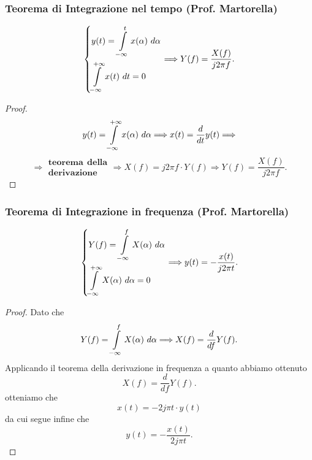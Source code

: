 \documentclass[12pt,oneside,openany]{memoir}
\numberwithin{equation}{subsection}
\newcommand{\dt}{\ dt}
\begin{document}
\subsubsection{Teorema di Integrazione nel tempo (Prof. Martorella)}
\[
    \begin{dcases}
        y(t) = \int\displaylimits_{-\infty}^{t} x(\alpha) \ d \alpha\\
        \int\displaylimits_{-\infty}^{+\infty} x(t) \dt = 0
    \end{dcases}
    \Longrightarrow
    Y(f) = \frac{X(f)}{j 2 \pi f}.
\]
\begin{proof}
\[
    y(t) = \int\displaylimits_{-\infty}^{+\infty} x(\alpha) \ d \alpha
    \Longrightarrow
    x(t) = \frac{d}{dt} y(t)
    \Longrightarrow
\]
\[
    \Longrightarrow
    \boldsymbol{\begin{split}teorema \ \ della\\ derivazione\end{split}}
    \Longrightarrow X(f) = j 2 \pi f \cdot Y(f) \Longrightarrow Y(f) = \frac{
    X(f)}{j 2 \pi f}.
\]
\end{proof}


\newpage
\subsubsection{Teorema di Integrazione in frequenza (Prof. Martorella)}
\[
    \begin{dcases}
        Y(f) = \int\displaylimits_{-\infty}^{f} X(\alpha) \ d \alpha\\
        \int\displaylimits_{-\infty}^{+\infty} X(\alpha) \ d \alpha = 0
    \end{dcases}
    \Longrightarrow
    y(t) = - \frac{x(t)}{j 2 \pi t}.
\]
\begin{proof}
Dato che
\[
    Y(f) = \int\displaylimits_{-\infty}^{f} X(\alpha) \ d \alpha \Longrightarrow
    X(f) = \frac{d}{df} Y(f).
\]
Applicando il teorema della derivazione in frequenza a quanto abbiamo ottenuto
\[
    X(f) = \frac{d}{df} Y(f).
\]
otteniamo che
\[
    x(t) = - 2 j \pi t \cdot y(t)
\]
da cui segue infine che
\[
    y(t) = - \frac{x(t)}{2 j \pi t}.
\]
\end{proof}

\end{document}
